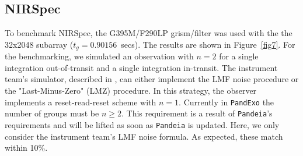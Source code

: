 \documentclass[iop]{emulateapj}
\begin{document}
\subsection{NIRSpec}
To benchmark NIRSpec, the G395M/F290LP grism/filter was used with the the 32x2048 subarray ($t_g=0.90156$~secs). The results are shown in Figure~\ref{fig7}. For the benchmarking, we simulated an observation with $n=2$ for a single integration out-of-transit and a single integration in-transit. The instrument team's simulator, described in \citet{nie16}, can either implement the LMF noise procedure or the "Last-Minus-Zero" (LMZ) procedure. In this strategy, the observer implements a reset-read-reset scheme with $n=1$. Currently in \texttt{PandExo} the number of groups must be $n\ge2$. This requirement is a result of \texttt{Pandeia}'s requirements and will be lifted as soon as \texttt{Pandeia} is updated. Here, we only consider the instrument team's LMF noise formula. As expected, these match within 10\%.
\end{document}
